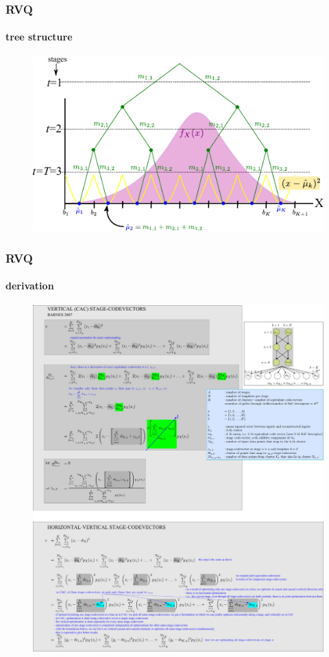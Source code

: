 \begin{frame}
\frametitle{RVQ}
\framesubtitle{tree structure}
\logoCSIPCPL\mypagenum
	\begin{figure}				
		\includegraphics[width=1.0\textwidth]{thesis/RVQ_graphicalReconstruction.pdf}
	\end{figure}
\end{frame}




\begin{frame}[plain]
\frametitle{RVQ}
\framesubtitle{derivation}
\logoCSIPCPL\mypagenum
	\begin{changemargin}{-1.3in}{0in}
		\begin{figure}				
			\includegraphics[width=1.3\textwidth]{thesis/RVQ_CAC_derivation.pdf}
		\end{figure}
	\end{changemargin}
\end{frame}


